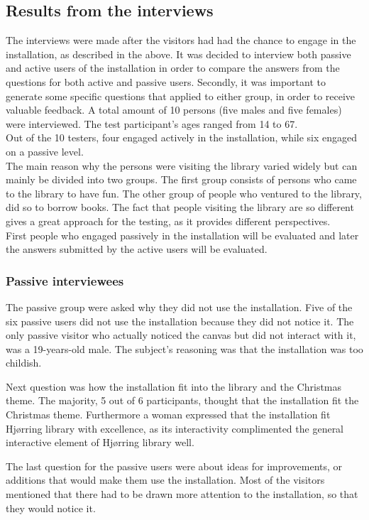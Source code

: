 \subsection{Results from the interviews}
The interviews were made after the visitors had had the chance to engage in the installation, as described in the above. It was decided to interview both passive and active users of the installation in order to compare the answers from the questions for both active and passive users. Secondly, it was important to generate some specific questions that applied to either group, in order to receive valuable feedback. A total amount of 10 persons (five males and five females) were interviewed. The test participant's ages ranged from 14 to 67.\\ Out of the 10 testers, four engaged actively in the installation, while six engaged on a passive level.\\
The main reason why the persons were visiting the library varied widely but can mainly be divided into two groups. The first group consists of persons who came to the library to have fun. The other group of people who ventured to the library, did so to borrow books.
The fact that people visiting the library are so different gives a great approach for the testing, as it provides different perspectives.\\
First people who engaged passively in the installation will be evaluated and later the answers submitted by the active users will be evaluated.\\

\subsubsection{Passive interviewees}
The passive group were asked why they did not use the installation. Five of the six passive users did not use the installation because they did not notice it. The only passive visitor who actually noticed the canvas but did not interact with it, was a 19-years-old male. The subject's reasoning was that the installation was too childish. 

Next question was how the installation fit into the library and the Christmas theme. The majority, 5 out of 6 participants, thought that the installation fit the Christmas theme. Furthermore a woman expressed that the installation fit Hj{\o}rring library with excellence, as its interactivity complimented the general interactive element of Hj{\o}rring library well. 

The last question for the passive users were about ideas for improvements, or additions that would make them use the installation.
Most of the visitors mentioned that there had to be drawn more attention to the installation, so that they would notice it. 

